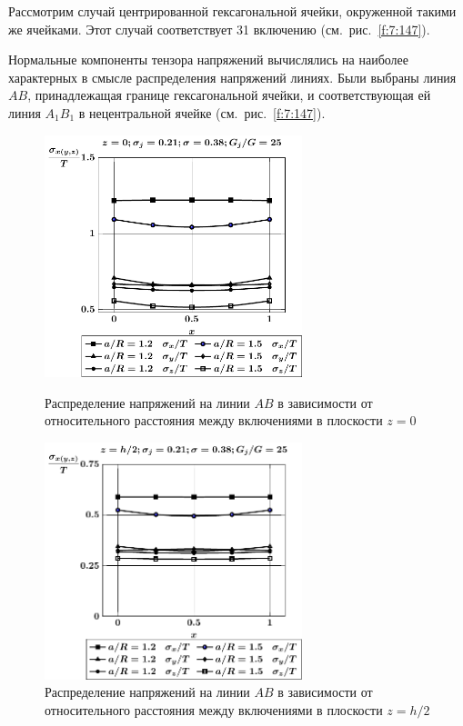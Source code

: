Рассмотрим случай центрированной гексагональной ячейки, окруженной такими же ячейками. Этот случай соответствует 31 включению (см.~рис.~\ref{f:7:147}).


Нормальные компоненты тензора напряжений вычислялись на наиболее характерных в смысле распределения напряжений линиях. Были выбраны линия $AB$, принадлежащая границе гексагональной ячейки, и соответствующая ей линия $A_1B_1$ в нецентральной ячейке (см.~рис.~\ref{f:7:147}).

\begin{figure}[h!]
\centering\footnotesize
\parbox[b]{7.5cm}{\centering\includegraphics[width=7.5cm]{inc31-a-h10-r10-g25-z0.pdf}
\caption{Распределение напряжений на линии $AB$ в зависимости от относительного расстояния между включениями в плоскости $z=0$
\label{f:7:120}}}\hfil\hfil
\parbox[b]{7.5cm}{\centering\includegraphics[width=7.5cm]{inc31-a-h10-r10-g25-z1.pdf}
\caption{Распределение напряжений на линии $AB$ в зависимости от относительного расстояния между включениями в плоскости $z=h/2$
\label{f:7:121}}}
\end{figure}

